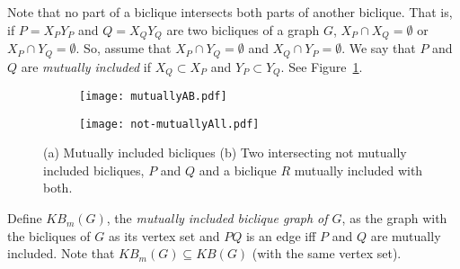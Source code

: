\documentclass{article}
\newcommand{\define}[1]{\emph{#1}}
\begin{document}
Note  that  no part  of  a  biclique  intersects both parts  of  another
biclique. That is, if $P = X_PY_P$ and $Q = X_QY_Q$ are two bicliques of
a graph $G$, $X_P \cap X_Q = \emptyset$ or $X_P \cap Y_Q = \emptyset$.
%
So,    assume     that    $X_P    \cap    Y_Q     =    \emptyset$    and
$X_Q  \cap   Y_P  =   \emptyset$.   We   say  that   $P$  and   $Q$  are
\define{mutually  included}  if  $X_Q  \subset  X_P$  and  $Y_P  \subset
Y_Q$. See Figure~\ref{fig:mutuallyAB}.

\begin{figure}[htb]
\centering
\begin{subfigure}{.5\textwidth}
  \centering
  \texttt{[image: mutuallyAB.pdf]}
  \caption{}
  \label{fig:mutuallyAB}
\end{subfigure}%
\begin{subfigure}{.5\textwidth}
  \centering
  \texttt{[image: not-mutuallyAll.pdf]}
  \caption{}
  \label{fig:not-mutuallyAll}
\end{subfigure}%
\caption{(a) Mutually included bicliques (b) Two   intersecting    not   mutually
  included bicliques, $P$  and $Q$ and a biclique  $R$ mutually included
  with both.}
\end{figure}

Define $KB_m(G)$, the \define{mutually  included biclique graph of $G$},
as the graph with  the bicliques of $G$ as its  vertex set and $PQ$
is an edge iff  $P$ and $Q$ are mutually included.  Note that
$KB_m(G) \subseteq KB(G)$ (with the same vertex set).
\end{document}
